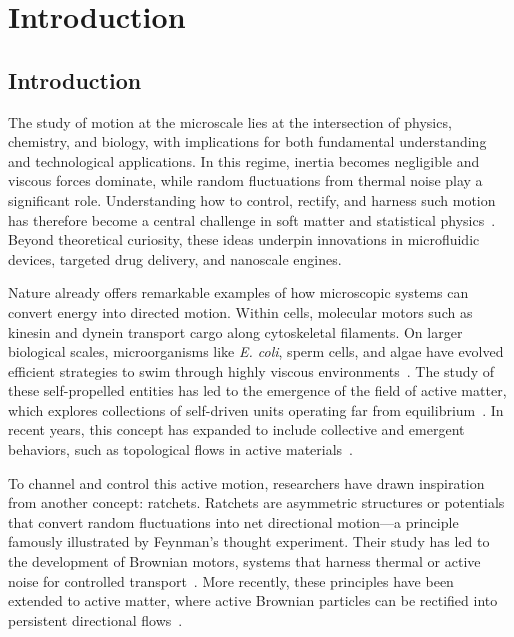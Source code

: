 \part{Introduction}
\label{part:introduction}

\chapter{Introduction}
\label{ch:introduction}

The study of motion at the microscale lies at the intersection of physics, chemistry, and biology, with implications for both fundamental understanding and technological applications. In this regime, inertia becomes negligible and viscous forces dominate, while random fluctuations from thermal noise play a significant role. Understanding how to control, rectify, and harness such motion has therefore become a central challenge in soft matter and statistical physics~\cite{purcell2014life,einstein1906theory}. Beyond theoretical curiosity, these ideas underpin innovations in microfluidic devices, targeted drug delivery, and nanoscale engines.

Nature already offers remarkable examples of how microscopic systems can convert energy into directed motion. Within cells, molecular motors such as kinesin and dynein transport cargo along cytoskeletal filaments. On larger biological scales, microorganisms like \textit{E. coli}, sperm cells, and algae have evolved efficient strategies to swim through highly viscous environments~\cite{howard2002mechanics, vale2003molecular, marchetti2013hydrodynamics}. The study of these self-propelled entities has led to the emergence of the field of active matter, which explores collections of self-driven units operating far from equilibrium~\cite{ramaswamy2010mechanics, needleman2017active, bechinger2016active}. In recent years, this concept has expanded to include collective and emergent behaviors, such as topological flows in active materials~\cite{shankar2022topological}.

To channel and control this active motion, researchers have drawn inspiration from another concept: ratchets. Ratchets are asymmetric structures or potentials that convert random fluctuations into net directional motion—a principle famously illustrated by Feynman’s thought experiment. Their study has led to the development of Brownian motors, systems that harness thermal or active noise for controlled transport~\cite{julicher1997modeling, reimann2002brownian}. More recently, these principles have been extended to active matter, where active Brownian particles can be rectified into persistent directional flows~\cite{fiasconaro2008active, reichhardt2017ratchet, rein2023force}.


